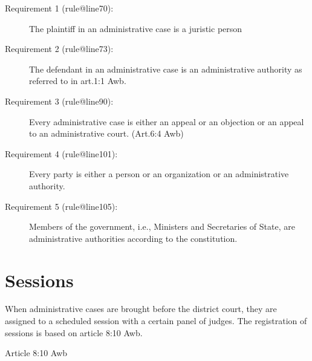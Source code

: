\documentclass[10pt,a4paper]{report}              %
\theoremstyle{plain}\theorembodyfont{\rmfamily}\newtheorem{definition}{Definition}[section]
\theoremstyle{plain}\theorembodyfont{\rmfamily}\newtheorem{designrule}[definition]{Requirement}
\begin{document}
\begin{description}
\item[Requirement 1 (rule@line70):]
\label{ReqRule:rule@line70}
The plaintiff in an administrative case is a juristic person

\end{description}
\begin{description}
\item[Requirement 2 (rule@line73):]
\label{ReqRule:rule@line73}
The defendant in an administrative case is an administrative authority
as referred to in art.1:1 Awb.

\end{description}
\begin{description}
\item[Requirement 3 (rule@line90):]
\label{ReqRule:rule@line90}
Every administrative case is either an appeal or an objection or an
appeal to an administrative court. (Art.6:4 Awb)

\end{description}
\begin{description}
\item[Requirement 4 (rule@line101):]
\label{ReqRule:rule@line101}
Every party is either a person or an organization or an administrative
authority.

\end{description}
\begin{description}
\item[Requirement 5 (rule@line105):]
\label{ReqRule:rule@line105}
Members of the government, i.e., Ministers and Secretaries of State, are
administrative authorities according to the constitution.

\end{description}
\section{Sessions}

When administrative cases are brought before the district court, they
are assigned to a scheduled session with a certain panel of judges. The
registration of sessions is based on article 8:10 Awb.

Article 8:10 Awb
\end{document}
